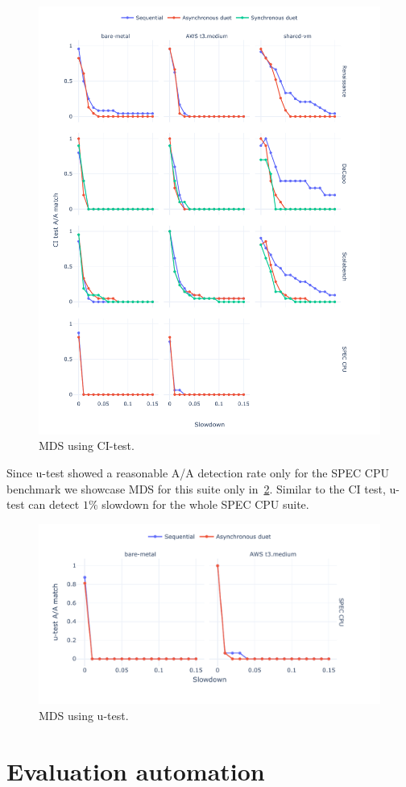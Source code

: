 \begin{figure}
	\centering
	\includegraphics[width=1\linewidth]{./figures/mds_citest.pdf}
	\caption{
    MDS using CI-test.
	}
	\label{fig:mds_citest}
\end{figure}

Since \mbox{u-test} showed a reasonable A/A detection rate only for the SPEC CPU benchmark we showcase MDS for this suite only in~\cref{fig:mds_utest}.
Similar to the CI test, \mbox{u-test} can detect $1\%$ slowdown for the whole SPEC CPU suite.

\begin{figure}
	\centering
	\includegraphics[width=1\linewidth]{./figures/mds_utest.pdf}
	\caption{
    MDS using \mbox{u-test}.
	}
	\label{fig:mds_utest}
\end{figure}

\section{Evaluation automation}
\label{sec:automation}


